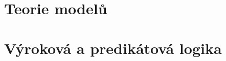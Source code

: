 \section{Teorie modelů}
\label{sec:teorie-modelu}



\section{Výroková a predikátová logika}
\label{sec:vyrokova-a-predikatova-logika}


